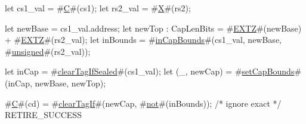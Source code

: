 let cs1_val = #\hyperref[sailRISCVzC]{C}#(cs1);
let rs2_val = #\hyperref[sailRISCVzX]{X}#(rs2);

let newBase = cs1_val.address;
let newTop : CapLenBits = #\hyperref[sailRISCVzEXTZ]{EXTZ}#(newBase) + #\hyperref[sailRISCVzEXTZ]{EXTZ}#(rs2_val);
let inBounds = #\hyperref[sailRISCVzinCapBounds]{inCapBounds}#(cs1_val, newBase, #\hyperref[sailRISCVzunsigned]{unsigned}#(rs2_val));

let inCap = #\hyperref[sailRISCVzclearTagIfSealed]{clearTagIfSealed}#(cs1_val);
let (_, newCap) = #\hyperref[sailRISCVzsetCapBounds]{setCapBounds}#(inCap, newBase, newTop);

#\hyperref[sailRISCVzC]{C}#(cd) = #\hyperref[sailRISCVzclearTagIf]{clearTagIf}#(newCap, #\hyperref[sailRISCVznot]{not}#(inBounds)); /* ignore exact */
RETIRE_SUCCESS
